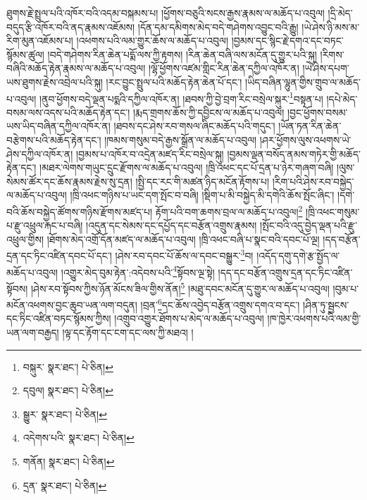 ཐུགས་རྗེ་སྤྲུལ་པའི་འཁོར་བའི་འདམ་བསྐམས་པ། །ཕྱོགས་བཅུའི་སངས་རྒྱས་རྣམས་ལ་མཆོད་པ་འབུལ། །དྲི་མེད་བདུད་རྩི་འཁོར་བའི་ནད་རྣམས་འཇོམས། །དོན་དམ་དམིགས་མེད་བདེ་གཤེགས་འབྱུང་བའི་རྒྱུ། །ཡེ་ཤེས་ཉི་མས་མ་རིག་མུན་འཇོམས་པ། །འཕགས་པའི་ལམ་གྱུར་ཆོས་ལ་མཆོད་པ་འབུལ། །བྱམས་དང་སྙིང་རྗེ་དགའ་དང་བཏང་སྙོམས་ཚུལ། །བདེ་གཤེགས་རིན་ཆེན་པདྨོ་ལས་ཀྱི་རྟགས། །རིན་ཆེན་བཞི་ལས་མངོན་དུ་གྱུར་པའི་སྐུ། །རིགས་བཞིའི་མཆོད་རྟེན་རྣམས་ལ་མཆོད་པ་འབུལ། །ལྷོ་ཕྱོགས་འཛམ་གླིང་རིན་ཆེན་དཀྱིལ་འཁོར་ན། །ཡེ་ཤེས་དཔག་ཡས་ཐུགས་རྗེས་འབྲེལ་པའི་སྐུ། །རང་བྱུང་སྤྲུལ་པའི་མཆོད་རྟེན་ཆེན་པོ་དང་། །ཡིད་བཞིན་ལྷུན་གྱིས་གྲུབ་ལ་མཆོད་པ་འབུལ། །ནུབ་ཕྱོགས་བདེ་ལྡན་པདྨའི་དཀྱིལ་འཁོར་ན། །ཐབས་ཀྱི་བྱེ་བྲག་རིང་བསྲེལ་སྐུར་\footnote{བསྐུར་  སྣར་ཐང་།  པེ་ཅིན། }བསྟན་པ། །དཔེ་མེད་བསམ་ལས་འདས་པའི་མཆོད་རྟེན་དང་། །རྨད་གྲགས་ཆོས་ཀྱི་དབྱིངས་ལ་མཆོད་པ་འབུལ། །བྱང་ཕྱོགས་བསམ་ཡས་ཡིད་བཞིན་དཀྱིལ་འཁོར་ན། །ཐབས་དང་ཤེས་རབ་གསལ་ཞིང་མཆོད་པའི་གདུང་། །ཡོན་ཏན་རིན་ཆེན་བརྩེགས་པའི་མཆོད་རྟེན་དང་། །ཁམས་གསུམ་བདེ་རྒྱས་སྒྲོན་ལ་མཆོད་པ་འབུལ། །ཤར་ཕྱོགས་ལུས་འཕགས་ཡེ་ཤེས་དཀྱིལ་འཁོར་ན། །བྱམས་པ་འཁོར་བ་འདྲེན་མཛད་རིང་བསྲེལ་སྐུ། །བྱམས་ལྡན་བསོད་ནམས་གཏེར་གྱི་མཆོད་རྟེན་དང་། །མཐར་ལེགས་གཡུང་དྲུང་རྫོགས་ལ་མཆོད་པ་འབུལ། །ཁྲི་འཕང་དང་པོ་དྲན་པ་ཉེར་གཞག་བཞི། །ལུས་སེམས་ཚོར་དང་ཆོས་རྣམས་རྗེས་སུ་དྲན། །སྤྱི་དང་རང་གི་མཚན་ཉིད་མངོན་རྟོགས་པ། །རིག་པའི་ཤེས་རབ་བསྐྱེད་ལ་མཆོད་པ་འབུལ། །ཁྲི་འཕང་གཉིས་པ་ཡང་དག་སྤོང་བ་བཞི། །སྡིག་པ་མི་བསྐྱེད་མི་དགེའི་ཆོས་སྤོང་ཞིང་། །དགེ་བའི་ཆོས་བསྐྱེད་ཚོགས་གཉིས་རྫོགས་མཛད་པ། རྟོག་པའི་བག་ཆགས་བྲལ་ལ་མཆོད་པ་འབུལ།\footnote{དབུལ།  སྣར་ཐང་།  པེ་ཅིན། } །ཁྲི་འཕང་གསུམ་པ་རྫུ་འཕྲུལ་རྐང་པ་བཞི། །འདུན་དང་སེམས་དང་དཔྱོད་དང་བརྩོན་འགྲུས་རྣམས། །སྤོང་བའི་འདུ་བྱེད་ལྡན་པའི་རྫུ་འཕྲུལ་གྱིས། །ཐོགས་མེད་འགྲོ་དོན་མཛད་ལ་མཆོད་པ་འབུལ། །ཁྲི་འཕང་བཞི་པ་སྣང་བའི་དབང་པོ་ལྔ། །དད་བརྩོན་དྲན་དང་ཏིང་འཛིན་དབང་པོ་དང་། །ཤེས་རབ་དབང་པོ་ཆོས་ལ་དབང་བསྒྱུར་\footnote{སྒྱུར་  སྣར་ཐང་།  པེ་ཅིན། }བ། །འདོད་དགུ་དགེ་རྩ་སྤྱོད་ལ་མཆོད་པ་འབུལ། །འགྱུར་མེད་བུམ་རྟེན་:འདེབས་པའི་\footnote{འདེགས་པའི་  སྣར་ཐང་།  པེ་ཅིན། }སྟོབས་ལྔ་སྟེ། །དད་དང་བརྩོན་འགྲུས་དྲན་དང་ཏིང་འཛིན་སྟོབས། །ཤེས་རབ་སྟོབས་ཀྱིས་ཉོན་མོངས་ཟིལ་གྱིས་ནོན།\footnote{གནོན།  སྣར་ཐང་།  པེ་ཅིན། } །མཐུ་དབང་མངོན་དུ་གྱུར་ལ་མཆོད་པ་འབུལ། །བུམ་པ་མངོན་འཕགས་བྱང་ཆུབ་ཡན་ལག་བདུན། །བྲན་\footnote{དྲན་  སྣར་ཐང་།  པེ་ཅིན། }དང་ཆོས་འབྱེད་བརྩོན་འགྲུས་དགའ་བ་དང་། །ཤིན་ཏུ་སྦྱངས་དང་ཏིང་འཛིན་བཏང་སྙོམས་ཀྱིས། །འགྲུབ་འགྱུར་ཐོགས་པ་མེད་ལ་མཆོད་པ་འབུལ། །ཁ་ཁྱེར་འཕགས་པའི་ལམ་གྱི་ཡན་ལག་བརྒྱད། །ལྟ་དང་རྟོག་དང་ངག་དང་ལས་ཀྱི་མཐའ། །

